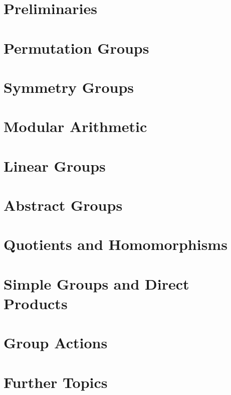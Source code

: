 \documentclass[11pt,oneside]{book}
\theoremstyle{definition}
\numberwithin{equation}{section}
\begin{document}
\newpage
\mainmatter

\setcounter{chapter}{-1}
\chapter{Preliminaries}


\chapter{Permutation Groups}


\chapter{Symmetry Groups}

\newpage


\chapter{Modular Arithmetic}


\chapter{Linear Groups}


\chapter{Abstract Groups}

\newpage

\chapter{Quotients and Homomorphisms}

\newpage


\chapter{Simple Groups and Direct Products}

\newpage


\chapter{Group Actions}


\chapter{Further Topics}

\newpage

\newpage


\backmatter
\printindex
\end{document}
